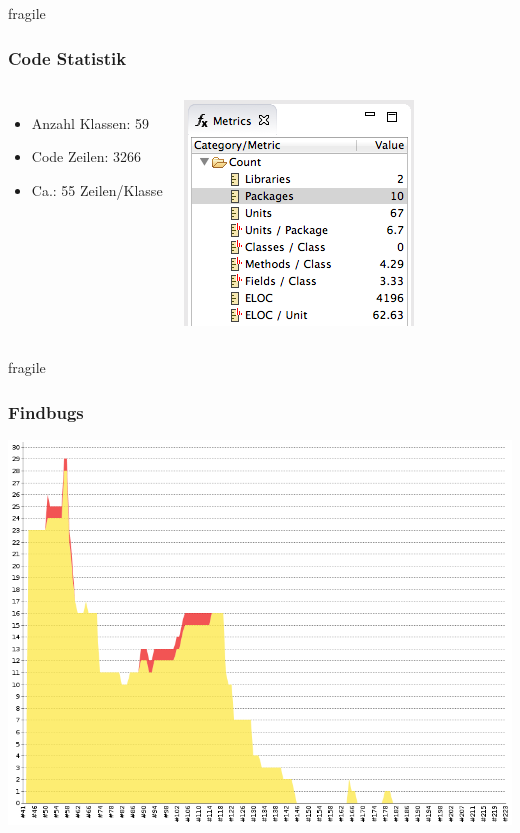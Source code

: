 \documentclass[10pt, compress]{beamer}
\begin{document}
\begin{frame}{fragile}
   \frametitle{Code Statistik}
  \begin{columns}[onlytextwidth]
\begin{itemize}
  \item Anzahl Klassen: 59
  \item Code Zeilen: 3266
  \item Ca.: 55 Zeilen/Klasse
\end{itemize}
\includegraphics[width=\textwidth]{stan-metrics}
\end{columns}

\end{frame}
\begin{frame}{fragile}
   \frametitle{Findbugs}
\includegraphics[scale=0.35]{findbugs}
\end{frame}
\end{document}
